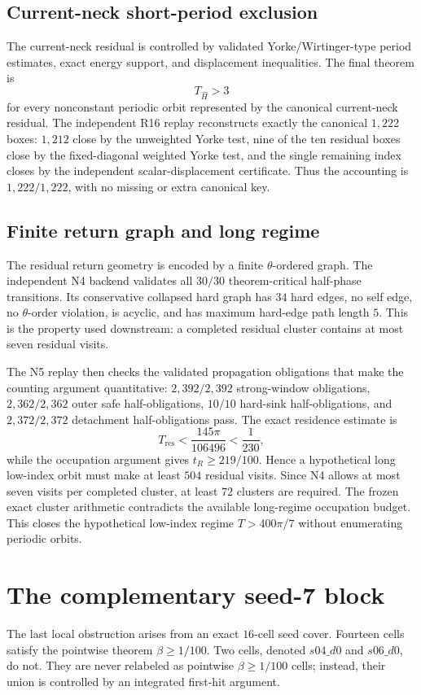 \documentclass[11pt]{article}
\begin{document}
\subsection{Current-neck short-period exclusion}
The current-neck residual is controlled by validated Yorke/Wirtinger-type period estimates, exact energy support, and displacement inequalities. The final theorem is
\[
T_{\widehat H}>3
\]
for every nonconstant periodic orbit represented by the canonical current-neck residual. The independent R16 replay reconstructs exactly the canonical $1{,}222$ boxes: $1{,}212$ close by the unweighted Yorke test, nine of the ten residual boxes close by the fixed-diagonal weighted Yorke test, and the single remaining index closes by the independent scalar-displacement certificate. Thus the accounting is $1{,}222/1{,}222$, with no missing or extra canonical key.

\subsection{Finite return graph and long regime}
The residual return geometry is encoded by a finite $\theta$-ordered graph. The independent N4 backend validates all $30/30$ theorem-critical half-phase transitions. Its conservative collapsed hard graph has $34$ hard edges, no self edge, no $\theta$-order violation, is acyclic, and has maximum hard-edge path length $5$. This is the property used downstream: a completed residual cluster contains at most seven residual visits.

The N5 replay then checks the validated propagation obligations that make the counting argument quantitative: $2{,}392/2{,}392$ strong-window obligations, $2{,}362/2{,}362$ outer safe half-obligations, $10/10$ hard-sink half-obligations, and $2{,}372/2{,}372$ detachment half-obligations pass. The exact residence estimate is
\[
T_{\mathrm{res}}<\frac{145\pi}{106496}<\frac1{230},
\]
while the occupation argument gives $t_R\ge219/100$. Hence a hypothetical long low-index orbit must make at least $504$ residual visits. Since N4 allows at most seven visits per completed cluster, at least $72$ clusters are required. The frozen exact cluster arithmetic contradicts the available long-regime occupation budget. This closes the hypothetical low-index regime $T>400\pi/7$ without enumerating periodic orbits.

\section{The complementary seed-7 block}
The last local obstruction arises from an exact $16$-cell seed cover. Fourteen cells satisfy the pointwise theorem $\beta\ge1/100$. Two cells, denoted $s04\_d0$ and $s06\_d0$, do not. They are never relabeled as pointwise $\beta\ge1/100$ cells; instead, their union is controlled by an integrated first-hit argument.
\end{document}
